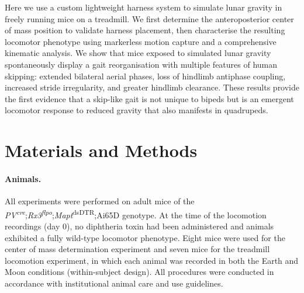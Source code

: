 \documentclass[blue]{enslyonstage}
\begin{document}
Here we use a custom lightweight harness system to simulate lunar gravity in
freely running mice on a treadmill. We first determine the anteroposterior
center of mass position to validate harness placement, then characterise the
resulting locomotor phenotype using markerless motion capture and a
comprehensive kinematic analysis. We show that mice exposed to simulated lunar
gravity spontaneously display a gait reorganisation with multiple features of
human skipping: extended bilateral aerial phases, loss of hindlimb antiphase
coupling, increased stride irregularity, and greater hindlimb clearance. These
results provide the first evidence that a skip-like gait is not unique to
bipeds but is an emergent locomotor response to reduced gravity that also
manifests in quadrupeds.

\section{Materials and Methods}
\label{sec:methods}
%

\paragraph{Animals.}
All experiments were performed on adult mice of the
\textit{PV}\textsuperscript{\textit{cre}};\textit{Rx3}\textsuperscript{\textit{flpo}};\textit{Mapt}\textsuperscript{dsDTR};Ai65D
genotype. At the time of the locomotion recordings (day 0), no diphtheria toxin
had been administered and animals exhibited a fully wild-type locomotor
phenotype\cite{santuzWalkingMoonHypogravity2026}. Eight mice were used for the
center of mass determination experiment and seven mice for the treadmill
locomotion experiment, in which each animal was recorded in both the Earth and
Moon conditions (within-subject design). All procedures were conducted in
accordance with institutional animal care and use
guidelines\cite{santuzWalkingMoonHypogravity2026}.
\end{document}
